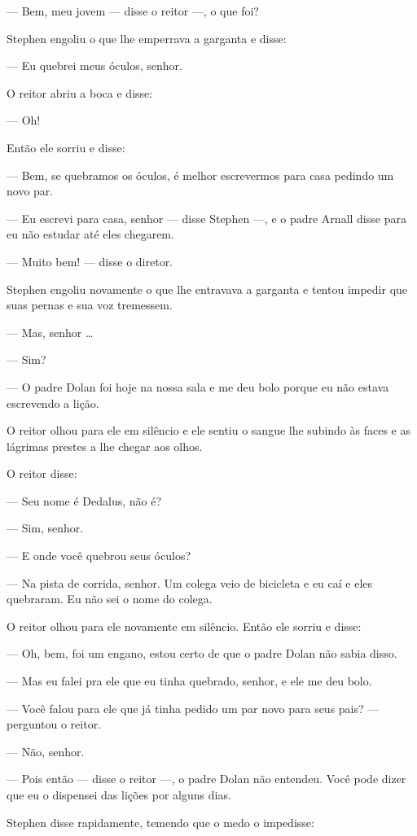  --- Bem, meu jovem --- disse o reitor ---, o que foi?

Stephen engoliu o que lhe emperrava a garganta e disse:

 --- Eu quebrei meus óculos, senhor.

O reitor abriu a boca e disse:

 --- Oh!

Então ele sorriu e disse:

 --- Bem, se quebramos os óculos, é melhor escrevermos para casa pedindo um
novo par.

 --- Eu escrevi para casa, senhor --- disse Stephen ---, e o padre Arnall disse para
eu não estudar até eles chegarem.

 --- Muito bem! --- disse o diretor.

Stephen engoliu novamente o que lhe entravava a garganta e tentou
impedir que suas pernas e sua voz tremessem.

 --- Mas, senhor \ldots{}

 --- Sim?

 --- O padre Dolan foi hoje na nossa sala e me deu bolo porque eu não
estava escrevendo a lição.

O reitor olhou para ele em silêncio e ele sentiu o sangue lhe subindo às
faces e as lágrimas prestes a lhe chegar aos olhos.

O reitor disse:

 --- Seu nome é Dedalus, não é?

 --- Sim, senhor.

 --- E onde você quebrou seus óculos?

 --- Na pista de corrida, senhor. Um colega veio de bicicleta e eu caí e
eles quebraram. Eu não sei o nome do colega.

O reitor olhou para ele novamente em silêncio. Então ele sorriu e disse:

 --- Oh, bem, foi um engano, estou certo de que o padre Dolan não sabia
disso.

 --- Mas eu falei pra ele que eu tinha quebrado, senhor, e ele me deu bolo.

 --- Você falou para ele que já tinha pedido um par novo para seus pais? --- perguntou o
reitor.

 --- Não, senhor.

 --- Pois então --- disse o reitor ---, o padre Dolan não entendeu. Você pode
dizer que eu o dispensei das lições por alguns dias.

Stephen disse rapidamente, temendo que o medo o impedisse:

